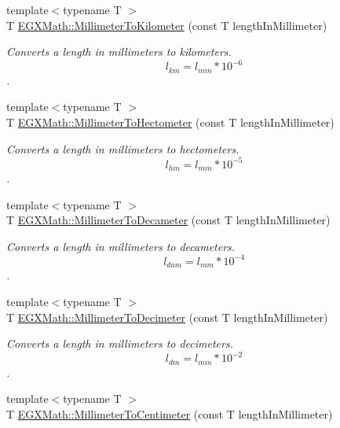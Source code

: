 \begin{DoxyCompactItemize}
{\footnotesize template$<$typename T $>$ }\\T \mbox{\hyperlink{group___e_g_x_math-_conversions-_length_conversions-_s_i-_millimeter-_s_i_ga1c5b03f2d0745187350584f77f406f13}{E\+G\+X\+Math\+::\+Millimeter\+To\+Kilometer}} (const T length\+In\+Millimeter)
\begin{DoxyCompactList}\small\item\em Converts a length in millimeters to kilometers. \[ l_{km}=l_{mm} * 10^{-6} \]. \end{DoxyCompactList}\item 
{\footnotesize template$<$typename T $>$ }\\T \mbox{\hyperlink{group___e_g_x_math-_conversions-_length_conversions-_s_i-_millimeter-_s_i_gaa4a0a12379c507ce0ffb4a950174980c}{E\+G\+X\+Math\+::\+Millimeter\+To\+Hectometer}} (const T length\+In\+Millimeter)
\begin{DoxyCompactList}\small\item\em Converts a length in millimeters to hectometers. \[ l_{hm}=l_{mm} * 10^{-5} \]. \end{DoxyCompactList}\item 
{\footnotesize template$<$typename T $>$ }\\T \mbox{\hyperlink{group___e_g_x_math-_conversions-_length_conversions-_s_i-_millimeter-_s_i_gaf0e54830f6ae997dde95341e87638bf5}{E\+G\+X\+Math\+::\+Millimeter\+To\+Decameter}} (const T length\+In\+Millimeter)
\begin{DoxyCompactList}\small\item\em Converts a length in millimeters to decameters. \[ l_{dam}=l_{mm} * 10^{-4} \]. \end{DoxyCompactList}\item 
{\footnotesize template$<$typename T $>$ }\\T \mbox{\hyperlink{group___e_g_x_math-_conversions-_length_conversions-_s_i-_millimeter-_s_i_gad38e2be59f56a27e7628cfcbaa4a7df2}{E\+G\+X\+Math\+::\+Millimeter\+To\+Decimeter}} (const T length\+In\+Millimeter)
\begin{DoxyCompactList}\small\item\em Converts a length in millimeters to decimeters. \[ l_{dm}=l_{mm} * 10^{-2} \]. \end{DoxyCompactList}\item 
{\footnotesize template$<$typename T $>$ }\\T \mbox{\hyperlink{group___e_g_x_math-_conversions-_length_conversions-_s_i-_millimeter-_s_i_gaa77c48215c6c4f46394025af4cb26ead}{E\+G\+X\+Math\+::\+Millimeter\+To\+Centimeter}} (const T length\+In\+Millimeter)

\end{DoxyCompactItemize}

